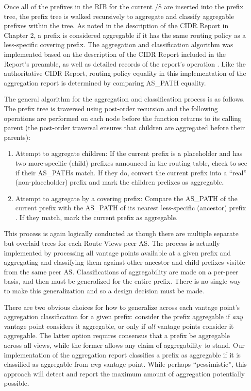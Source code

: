 Once all of the prefixes in the RIB for the current /8 are inserted into the
prefix tree, the prefix tree is walked recursively to aggregate and classify
aggregable prefixes within the tree. As noted in the description of the CIDR
Report in Chapter 2, a prefix is considered aggregable if it has the same
routing policy as a less-specific covering prefix. The aggregation and
classification algorithm was implemented based on the description of the CIDR
Report included in the Report's preamble, as well as detailed records of the
report's operation \cite{cidr-report-details}. Like the authoritative CIDR
Report, routing policy equality in this implementation of the aggregation
report is determined by comparing AS\_PATH equality.

The general algorithm for the aggregation and classification process is as
follows. The prefix tree is traversed using post-order recursion and the
following operations are performed on each node before the function returns to
its calling parent (the post-order traversal ensures that children are
aggregated before their parents):

\begin{enumerate}
    \item{Attempt to aggregate children: If the current prefix is a placeholder
    and has two more-specific (child) prefixes announced in the routing table,
    check to see if their AS\_PATHs match. If they do, convert the current
    prefix into a ``real'' (non-placeholder) prefix and mark the children
    prefixes as aggregable.}
    \item{Attempt to aggregate by a covering prefix: Compare the AS\_PATH of
    the current prefix with the AS\_PATH of its nearest less-specific
    (ancestor) prefix . If they match, mark the current prefix as aggregable.}
\end{enumerate}

This process is again logically conducted as though there are multiple separate
but overlaid trees for each Route Views peer AS. The process is
actually implemented by processing all vantage points available at a given
prefix and aggregating and classifying them against other ancestor and child
prefixes visible from the same peer AS. Classifications of aggregability are
made on a per-peer basis, and then must be generalized for the entire prefix.
There is no single way to make this generalization and so a design decision
must be made.

There are two obvious choices for how to generalize across each vantage point's
aggregation classification for a given prefix: consider the prefix aggregable
if \emph{any} vantage point considers it aggregable, or only if \emph{all}
vantage points consider it aggregable. The latter option requires consensus
that a prefix be aggregable across all views, while the former allows any claim
of aggregability to stand. Our implementation of the aggregation report
classifies a prefix as aggregable if it is classified as aggregable from
\emph{any} vantage point. While perhaps ``pessimistic'', this approach will
detect and report the maximum amount of aggregation potentially possible.


